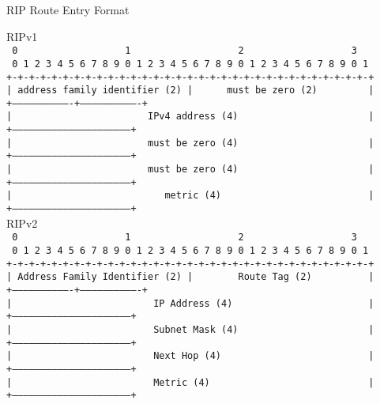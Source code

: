 \begin{frame}{RIP Route Entry Format}
	\begin{center}
		\tiny{RIPv1\\
			\texttt{~0~~~~~~~~~~~~~~~~~~~1~~~~~~~~~~~~~~~~~~~2~~~~~~~~~~~~~~~~~~~3~~~~
				  \\~0~1~2~3~4~5~6~7~8~9~0~1~2~3~4~5~6~7~8~9~0~1~2~3~4~5~6~7~8~9~0~1~~
				  \\+-+-+-+-+-+-+-+-+-+-+-+-+-+-+-+-+-+-+-+-+-+-+-+-+-+-+-+-+-+-+-+-+
				  \\|~address~family~identifier~(2)~|~~~~~~must~be~zero~(2)~~~~~~~~~|
				  \\+-------------------------------+-------------------------------+
				  \\|~~~~~~~~~~~~~~~~~~~~~~~~IPv4~address~(4)~~~~~~~~~~~~~~~~~~~~~~~|
				  \\+---------------------------------------------------------------+
				  \\|~~~~~~~~~~~~~~~~~~~~~~~~must~be~zero~(4)~~~~~~~~~~~~~~~~~~~~~~~|
				  \\+---------------------------------------------------------------+
				  \\|~~~~~~~~~~~~~~~~~~~~~~~~must~be~zero~(4)~~~~~~~~~~~~~~~~~~~~~~~|
				  \\+---------------------------------------------------------------+
				  \\|~~~~~~~~~~~~~~~~~~~~~~~~~~~metric~(4)~~~~~~~~~~~~~~~~~~~~~~~~~~|
				  \\+---------------------------------------------------------------+}
			\\\vspace{0.3cm}
			RIPv2\\
			\texttt{~0~~~~~~~~~~~~~~~~~~~1~~~~~~~~~~~~~~~~~~~2~~~~~~~~~~~~~~~~~~~3~~~~
				  \\~0~1~2~3~4~5~6~7~8~9~0~1~2~3~4~5~6~7~8~9~0~1~2~3~4~5~6~7~8~9~0~1~~
				  \\+-+-+-+-+-+-+-+-+-+-+-+-+-+-+-+-+-+-+-+-+-+-+-+-+-+-+-+-+-+-+-+-+
				  \\|~Address~Family~Identifier~(2)~|~~~~~~~~Route~Tag~(2)~~~~~~~~~~|
				  \\+-------------------------------+-------------------------------+
				  \\|~~~~~~~~~~~~~~~~~~~~~~~~~IP~Address~(4)~~~~~~~~~~~~~~~~~~~~~~~~|
				  \\+---------------------------------------------------------------+
				  \\|~~~~~~~~~~~~~~~~~~~~~~~~~Subnet~Mask~(4)~~~~~~~~~~~~~~~~~~~~~~~|
				  \\+---------------------------------------------------------------+
				  \\|~~~~~~~~~~~~~~~~~~~~~~~~~Next~Hop~(4)~~~~~~~~~~~~~~~~~~~~~~~~~~|
				  \\+---------------------------------------------------------------+
				  \\|~~~~~~~~~~~~~~~~~~~~~~~~~Metric~(4)~~~~~~~~~~~~~~~~~~~~~~~~~~~~|
				  \\+---------------------------------------------------------------+}
		}
	\end{center}
\end{frame}

